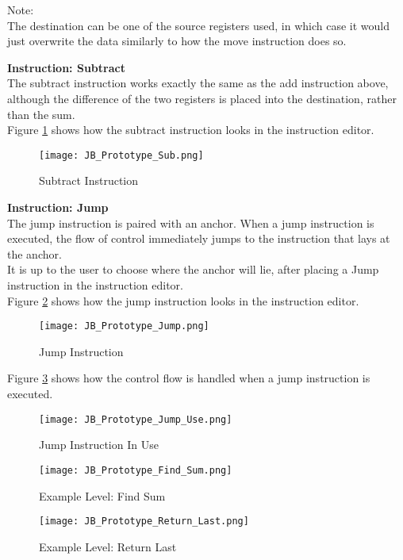 Note:\\
The destination can be one of the source registers used, in which case it would
just overwrite the data similarly to how the move instruction does so.\\
\newpage

\textbf{Instruction: Subtract}\\

The subtract instruction works exactly the same as the add instruction above,
although the difference of the two registers is placed into the destination, rather
than the sum.\\

Figure \ref{fig:Sub_Instruction} shows how the subtract instruction looks in the
instruction editor.

\begin{figure}[!hb]
  \caption{Subtract Instruction}
  \label{fig:Sub_Instruction}
  \centering
  \texttt{[image: JB\_Prototype\_Sub.png]}
\end{figure}

\textbf{Instruction: Jump}\\

The jump instruction is paired with an anchor. When a jump instruction is executed,
the flow of control immediately jumps to the instruction that lays at the anchor.\\

It is up to the user to choose where the anchor will lie, after placing a Jump instruction
in the instruction editor.\\

Figure \ref{fig:Jump_Instruction} shows how the jump instruction looks in the
instruction editor.

\begin{figure}[!hb]
  \caption{Jump Instruction}
  \label{fig:Jump_Instruction}
  \centering
  \texttt{[image: JB\_Prototype\_Jump.png]}
\end{figure}

Figure \ref{fig:Jump_Instruction_Use} shows how the control flow is handled when a jump instruction is
executed.

\begin{figure}[!hb]
  \caption{Jump Instruction In Use}
  \label{fig:Jump_Instruction_Use}
  \centering
  \texttt{[image: JB\_Prototype\_Jump\_Use.png]}
\end{figure}
\vfill
\clearpage

\begin{figure}[!hb]
  \caption{Example Level: Find Sum}
  \label{fig:Find_Sum}
  \centering
  \texttt{[image: JB\_Prototype\_Find\_Sum.png]}
\end{figure}
\vfill
\clearpage

\begin{figure}[!hb]
  \caption{Example Level: Return Last}
  \label{fig:Return_Last}
  \centering
  \texttt{[image: JB\_Prototype\_Return\_Last.png]}
\end{figure}
\vfill
\clearpage

\newpage
